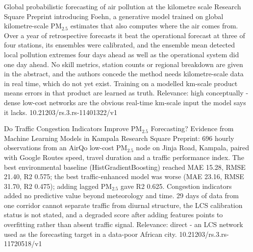 \documentclass[10pt]{article}
\begin{document}
\par{}\baselineskip{}\baselineskip
{}

{Global probabilistic forecasting of air pollution at the kilometre scale}
{Research Square}
{Preprint introducing Foehn, a generative model trained on global kilometre-scale PM$_{2.5}$ estimates that also computes where the air comes from. Over a year of retrospective forecasts it beat the operational forecast at three of four stations, its ensembles were calibrated, and the ensemble mean detected local pollution extremes four days ahead as well as the operational system did one day ahead. No skill metrics, station counts or regional breakdown are given in the abstract, and the authors concede the method needs kilometre-scale data in real time, which do not yet exist. Training on a modelled km-scale product means errors in that product are learned as truth. Relevance: high conceptually - dense low-cost networks are the obvious real-time km-scale input the model says it lacks.}
{10.21203/rs.3.rs-11401322/v1}

{Do Traffic Congestion Indicators Improve PM$_{2.5}$ Forecasting? Evidence from Machine Learning Models in Kampala}
{Research Square}
{Preprint: 696 hourly observations from an AirQo low-cost PM$_{2.5}$ node on Jinja Road, Kampala, paired with Google Routes speed, travel duration and a traffic performance index. The best environmental baseline (HistGradientBoosting) reached MAE 15.28, RMSE 21.40, R2 0.575; the best traffic-enhanced model was worse (MAE 23.16, RMSE 31.70, R2 0.475); adding lagged PM$_{2.5}$ gave R2 0.625. Congestion indicators added no predictive value beyond meteorology and time. 29 days of data from one corridor cannot separate traffic from diurnal structure, the LCS calibration status is not stated, and a degraded score after adding features points to overfitting rather than absent traffic signal. Relevance: direct - an LCS network used as the forecasting target in a data-poor African city.}
{10.21203/rs.3.rs-11720518/v1}
\end{document}
